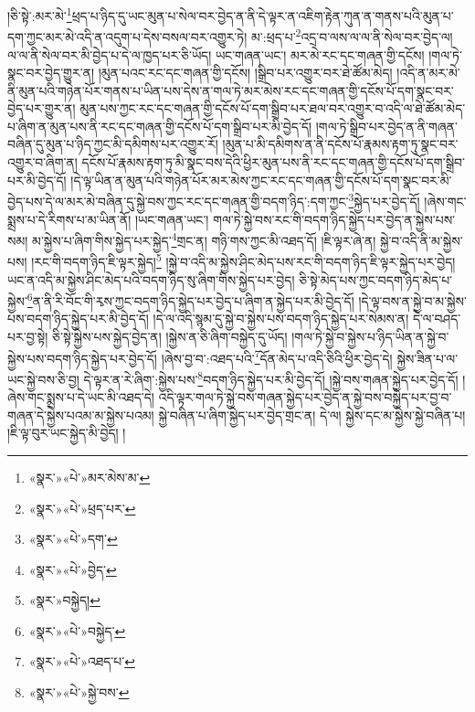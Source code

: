 །ཅི་སྟེ་:མར་མེ་\footnote{«སྣར་»«པེ་»མར་མེས་མ་}ཕྲད་པ་ཉིད་དུ་ཡང་མུན་པ་སེལ་བར་བྱེད་ན་ནི་དེ་ལྟར་ན་འཇིག་རྟེན་ཀུན་ན་གནས་པའི་མུན་པ་དག་ཀྱང་མར་མེ་འདི་ན་འདུག་པ་དེས་བསལ་བར་འགྱུར་ཏེ། མ་:ཕྲད་པ་\footnote{«སྣར་»«པེ་»ཕྲད་པར་}འདྲ་བ་ལས་ལ་ལ་ནི་སེལ་བར་བྱེད་ལ། ལ་ལ་ནི་སེལ་བར་མི་བྱེད་པ་དེ་ལ་ཁྱད་པར་ཅི་ཡོད། ཡང་གཞན་ཡང་། མར་མེ་རང་དང་གཞན་གྱི་དངོས། །གལ་ཏེ་སྣང་བར་བྱེད་གྱུར་ན། །མུན་པའང་རང་དང་གཞན་གྱི་དངོས། །སྒྲིབ་པར་འགྱུར་བར་ཐེ་ཚོམ་མེད། །འདི་ན་མར་མེ་ནི་མུན་པའི་གཉེན་པོར་གནས་པ་ཡིན་པས་དེས་ན་གལ་ཏེ་མར་མེས་རང་དང་གཞན་གྱི་དངོས་པོ་དག་སྣང་བར་བྱེད་པར་གྱུར་ན། མུན་པས་ཀྱང་རང་དང་གཞན་གྱི་དངོས་པོ་དག་སྒྲིབ་པར་ཐལ་བར་འགྱུར་བ་འདི་ལ་ཐེ་ཚོམ་མེད་པ་ཞིག་ན་མུན་པས་ནི་རང་དང་གཞན་གྱི་དངོས་པོ་དག་སྒྲིབ་པར་མི་བྱེད་དོ། །གལ་ཏེ་སྒྲིབ་པར་བྱེད་ན་ནི་གཞན་བཞིན་དུ་མུན་པ་ཉིད་ཀྱང་མི་དམིགས་པར་འགྱུར་རོ། །མུན་པ་མི་དམིགས་ན་ནི་དངོས་པོ་རྣམས་རྟག་ཏུ་སྣང་བར་འགྱུར་བ་ཞིག་ན། དངོས་པོ་རྣམས་རྟག་ཏུ་མི་སྣང་བས་དེའི་ཕྱིར་མུན་པས་ནི་རང་དང་གཞན་གྱི་དངོས་པོ་དག་སྒྲིབ་པར་མི་བྱེད་དོ། །དེ་ལྟ་ཡིན་ན་མུན་པའི་གཉེན་པོར་མར་མེས་ཀྱང་རང་དང་གཞན་གྱི་དངོས་པོ་དག་སྣང་བར་མི་བྱེད་པས་དེ་ལ་མར་མེ་བཞིན་དུ་སྐྱེ་བས་ཀྱང་རང་དང་གཞན་གྱི་བདག་ཉིད་:དག་ཀྱང་\footnote{«སྣར་»«པེ་»དག་}སྐྱེད་པར་བྱེད་དོ། །ཞེས་གང་སྨྲས་པ་དེ་རིགས་པ་མ་ཡིན་ནོ། །ཡང་གཞན་ཡང་། གལ་ཏེ་སྐྱེ་བས་རང་གི་བདག་ཉིད་སྐྱེད་པར་བྱེད་ན་སྐྱེས་པས་སམ། མ་སྐྱེས་པ་ཞིག་གིས་སྐྱེད་པར་སྐྱེད་\footnote{«སྣར་»«པེ་»བྱེད་}གྲང་ན། གཉི་གས་ཀྱང་མི་འཐད་དོ། །ཇི་ལྟར་ཞེ་ན། སྐྱེ་བ་འདི་ནི་མ་སྐྱེས་པས། །རང་གི་བདག་ཉིད་ཇི་ལྟར་སྐྱེད།\footnote{«སྣར་»བསྐྱེད།} །སྐྱེ་བ་འདི་མ་སྐྱེས་ཤིང་མེད་པས་རང་གི་བདག་ཉིད་ཇི་ལྟར་སྐྱེད་པར་བྱེད། ཡང་ན་འདི་མ་སྐྱེས་ཤིང་མེད་པའི་བདག་ཉིད་སུ་ཞིག་གིས་སྐྱེད་པར་བྱེད། ཅི་སྟེ་མེད་པས་ཀྱང་བདག་ཉིད་མེད་པ་སྐྱེས་\footnote{«སྣར་»«པེ་»བསྐྱེད་}ན་ནི་རི་བོང་གི་རྭས་ཀྱང་བདག་ཉིད་སྐྱེད་པར་བྱེད་པ་ཞིག་ན་སྐྱེད་པར་མི་བྱེད་དོ། །དེ་ལྟ་བས་ན་སྐྱེ་བ་མ་སྐྱེས་པས་བདག་ཉིད་སྐྱེད་པར་མི་བྱེད་དོ། །དེ་ལ་འདི་སྙམ་དུ་སྐྱེ་བ་སྐྱེས་པས་བདག་ཉིད་སྐྱེད་པར་སེམས་ན། དེ་ལ་བཤད་པར་བྱ་སྟེ། ཅི་སྟེ་སྐྱེས་པས་སྐྱེད་བྱེད་ན། །སྐྱེས་ན་ཅི་ཞིག་བསྐྱེད་དུ་ཡོད། །གལ་ཏེ་སྐྱེ་བ་སྐྱེས་པ་ཉིད་ཡིན་ན་སྐྱེ་བ་སྐྱེས་པས་བདག་ཉིད་སྐྱེད་པར་བྱེད་དོ། །ཞེས་བྱ་བ་:འཐད་པའི་\footnote{«སྣར་»«པེ་»འཐད་པ་}དོན་མེད་པ་འདི་ཅིའི་ཕྱིར་བྱེད་དེ། སྐྱེས་ཟིན་པ་ལ་ཡང་སྐྱེ་བས་ཅི་བྱ། དེ་ལྟར་ན་རེ་ཞིག་:སྐྱེས་པས་\footnote{«སྣར་»«པེ་»སྐྱེ་བས་}བདག་ཉིད་སྐྱེད་པར་མི་བྱེད་དོ། །སྐྱེ་བས་གཞན་སྐྱེད་པར་བྱེད་དོ། །ཞེས་གང་སྨྲས་པ་དེ་ཡང་མི་འཐད་དེ། འདི་ལྟར་གལ་ཏེ་སྐྱེ་བས་གཞན་སྐྱེད་པར་བྱེད་ན་སྐྱེ་བས་བསྐྱེད་པར་བྱ་བ་གཞན་དེ་སྐྱེས་པའམ་མ་སྐྱེས་པའམ། སྐྱེ་བཞིན་པ་ཞིག་སྐྱེད་པར་བྱེད་གྲང་ན། དེ་ལ། སྐྱེས་དང་མ་སྐྱེས་སྐྱེ་བཞིན་པ། །ཇི་ལྟ་བུར་ཡང་སྐྱེད་མི་བྱེད། །
